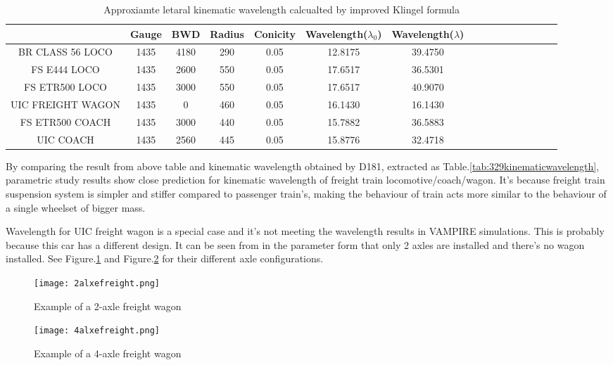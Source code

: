 \begin{table}[h]
  \centering
  \caption{Approxiamte letaral kinematic wavelength calcualted by improved Klingel formula}
    \begin{tabular}{cccccccccccccccc}
    \toprule
    & Gauge & BWD & Radius & Conicity & Wavelength($\lambda_0$) &Wavelength($\lambda$) & \\
    \midrule
    BR CLASS 56 LOCO  & 1435 & 4180 & 290 & 0.05 & 12.8175 & 39.4750 \\
    FS E444 LOCO  & 1435 & 2600 & 550 & 0.05 & 17.6517 & 36.5301 \\
    FS ETR500 LOCO  & 1435 & 3000 & 550 & 0.05 & 17.6517 & 40.9070\\
    UIC FREIGHT WAGON  & 1435 & 0 & 460 & 0.05 & 16.1430 & 16.1430 \\
    FS ETR500 COACH  & 1435 & 3000 & 440 & 0.05 & 15.7882 & 36.5883 & \\
    UIC COACH  & 1435 & 2560 & 445 & 0.05 & 15.8776 & 32.4718 &  \\
    \bottomrule
    \end{tabular}%
  \label{tab:addlabel}%
\end{table}%


By comparing the result from above table and kinematic wavelength obtained by D181, extracted as Table.\ref{tab:329kinematicwavelength}, parametric study results show close prediction for kinematic wavelength of freight train locomotive/coach/wagon. It's because freight train suspension system is simpler and stiffer compared to passenger train's, making the behaviour of train acts more similar to the behaviour of a single wheelset of bigger mass. 


Wavelength for UIC freight wagon is a special case and it's not meeting the wavelength results in VAMPIRE simulations. This is probably because this car has a different design. It can be seen from in the parameter form that only 2 axles are installed and there's no wagon installed. See Figure.\ref{fig:2axlefreight} and Figure.\ref{fig:4axlefreight} for their different axle configurations.

\begin{figure}[h]
	\centering
	\texttt{[image: 2alxefreight.png]}
	\caption{Example of a 2-axle freight wagon}
	\label{fig:2axlefreight}
\end{figure}

\begin{figure}[h]
	\centering
	\texttt{[image: 4alxefreight.png]}
	\caption{Example of a 4-axle freight wagon}
	\label{fig:4axlefreight}
\end{figure}


